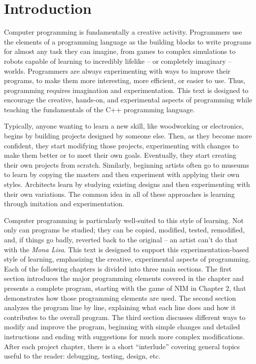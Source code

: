 \chapter{Introduction}


Computer programming is fundamentally a creative activity. 
Programmers use the elements of a programming language as the building blocks to write programs for almost any task they can imagine, from games to complex simulations to robots capable of learning to incredibly lifelike -- or completely imaginary -- worlds.   Programmers are always experimenting with ways to improve their programs, to make them more interesting, more efficient, or easier to use.  Thus,
programming requires imagination and experimentation. This text is designed to encourage the creative, hands-on, and experimental aspects of programming while teaching the fundamentals of the C++ programming language.

Typically, anyone wanting to learn a new skill, like woodworking or electronics, begins by building projects designed by someone else.  Then, as they become more confident, they start modifying those projects, experimenting with changes to make them better or to meet their own goals.  Eventually, they start creating their own projects from scratch.  Similarly, beginning artists often go to museums to learn by copying the masters and then experiment with applying their own styles.  Architects learn by studying existing designs and then experimenting with their own variations.  The common idea in all of these approaches is learning through imitation and experimentation.  

Computer programming is particularly well-suited to this style of learning.  Not only can programs be studied; they can be copied, modified, tested, remodified, and, if things go badly, reverted back to the original -- an artist can't do that with the \emph{Mona Lisa}.
This text is designed to support this experimentation-based style of learning, emphasizing the creative, experimental aspects of programming.  Each of the following chapters is divided into three main sections.  The first section introduces the major programming elements covered in the chapter and presents a complete program, starting with the game of NIM in Chapter 2, that demonstrates how those programming elements are used.  The second section analyzes the program line by line, explaining what each line does and how it contributes to the overall program.  The third section discusses different ways to modify and improve the program, beginning with simple changes and detailed instructions and ending with suggestions for much more complex modifications.   After each project chapter, there is a short ``interlude'' covering general topics useful to the reader: debugging, testing, design, etc.

